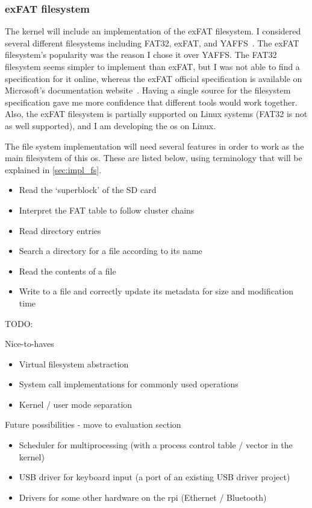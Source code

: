 \documentclass{article}
\begin{document}
\subsubsection{exFAT filesystem}
The kernel will include an implementation of the exFAT filesystem. I considered
several different filesystems including FAT32, exFAT, and
YAFFS~\cite{yaffs-fs}. The exFAT filesystem's popularity was the reason I chose
it over YAFFS. The FAT32 filesystem seems simpler to implement than exFAT, but
I was not able to find a specification for it online, whereas the exFAT
official specification is available on Microsoft's documentation
website~\cite{exFAT-specs}. Having a single source for the filesystem
specification gave me more confidence that different tools would work together.
Also, the exFAT filesystem is partially supported on Linux systems (FAT32 is
not as well supported), and I am developing the \gls{os} on Linux.

The file system implementation will need several features in order to work as
the main filesystem of this \gls{os}. These are listed below, using terminology
that will be explained in \autoref{sec:impl_fs}.

\begin{itemize}
    \item Read the `superblock' of the SD card
    \item Interpret the FAT table to follow cluster chains
    \item Read directory entries
    \item Search a directory for a file according to its name
    \item Read the contents of a file
    \item Write to a file and correctly update its metadata for size and
        modification time
\end{itemize}

TODO:

Nice-to-haves
\begin{itemize}
    \item Virtual filesystem abstraction
    \item System call implementations for commonly used operations
    \item Kernel / user mode separation
\end{itemize}

Future possibilities - move to evaluation section
\begin{itemize}
    \item Scheduler for multiprocessing (with a process control table / vector
        in the kernel)
    \item USB driver for keyboard input (a port of an existing USB driver
        project)
    \item Drivers for some other hardware on the \gls{rpi} (Ethernet /
        Bluetooth)
\end{itemize}
\end{document}
